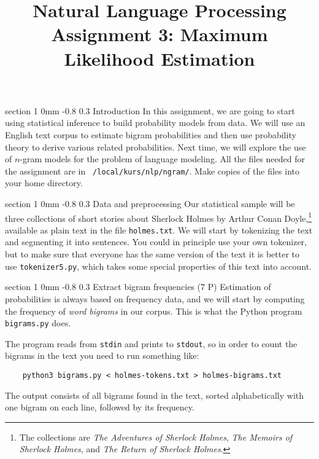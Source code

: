 \documentclass[11pt]{article}
\title{{\LARGE Natural Language Processing}\\[1.5mm]{\large Assignment 3: Maximum Likelihood Estimation}}
\author{}
\date{} %
\makeatletter
\newcommand{\newsec}[2]{\section{#1}\label{sec:#2}\noindent}
\renewcommand{\section}{\@startsection
{section}%
{1}%
{0mm}%
{-0.8\baselineskip}%
{0.3\baselineskip}%
{\bfseries\large}}%
\makeatother
\begin{document}
 

\maketitle
\vspace{-2mm} \newsec{Introduction}{intro}%
In this assignment, we are going to start using statistical inference
to build probability models from data.  We will use an English text
corpus to estimate bigram probabilities and then use probability
theory to derive various related probabilities. Next time, we will
explore the use of $n$-gram models for the problem of language
modeling. All the files needed for the assignment are in {\tt
  /local/kurs/nlp/ngram/}. Make copies of the files into your home
directory.

\newsec{Data and preprocessing}{data}%
Our statistical sample will be three collections of short stories
about Sherlock Holmes by Arthur Conan Doyle,\footnote{The collections
  are {\em The Adventures of Sherlock Holmes}, {\em The Memoirs of
    Sherlock Holmes}, and {\em The Return of Sherlock Holmes}.}
available as plain text in the file {\tt holmes.txt}. We will start by
tokenizing the text and segmenting it into sentences.  You could in
principle use your own tokenizer, but to make sure that everyone has
the same version of the text it is better to use {\tt tokenizer5.py},
which takes some special properties of this text into account.

\newsec{Extract bigram frequencies (7 P)}{bigrams}%
Estimation of probabilities is always based on frequency data, and we
will start by computing the frequency of \emph{word bigrams} in our
corpus. This is what the Python program {\tt bigrams.py} does.

\begin{center}
\fbox{

}
\end{center}
\newpage
\noindent
The program reads from {\tt stdin} and prints to {\tt stdout}, so in
order to count the bigrams in the text you need to run something like:
\begin{verbatim}
    python3 bigrams.py < holmes-tokens.txt > holmes-bigrams.txt
\end{verbatim}
The output consists of all bigrams found in the text, sorted
alphabetically with one bigram on each line, followed by its
frequency.
\end{document}

